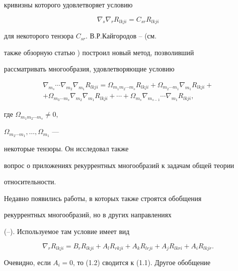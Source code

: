 кривизны которого удовлетворяет условию 


$$ 


\nabla_s\nabla_r R_{lkji}=C_{sr}R_{lkji} 


$$ 


для некоторого тензора $C_{sr}$. В.Р.Кайгородов \cite{4}--\cite{6} (см. 


также обзорную статью \cite{7}) построил новый метод, позволивший 


рассматривать многообразия, удовлетворяющие условию 


\begin{multline*} 


\nabla_{m_s}\dotsb\nabla_{m_2}\nabla_{m_1}R_{lkji}= 


\Omega_{m_1m_2\dotsb m_s}R_{lkji}+\Omega_{m_2\dotsb m_1} 


\nabla_{m_1}R_{lkji}+ \\ 


+\Omega_{m_3\dotsb m_s}\nabla_{m_2}\nabla_{m_1} 


R_{lkji}+\dotsb+\Omega_{m_s}\nabla_{m_{s-1}}\dotsb 


\nabla_{m_1}R_{lkji}, 


\end{multline*} 


где $\Omega_{m_1m_2\dotsb m_s}\ne 0$, 


$\Omega_{m_2\dotsb m_1},\dotsc,\Omega_{m_1}$ --- 


некоторые тензоры. Он исследовал также 


вопрос о приложениях рекуррентных многообразий к задачам общей теории 


относительности. 


 


Недавно появились работы, в которых также строятся обобщения 


рекуррентных многообразий, но в других направлениях 


(\cite{8}--\cite{12}). Используемое там условие имеет вид 


\begin{equation} 


\nabla_r R_{lkji}=B_r R_{lkji}+A_l R_{rkji}+ 


A_k R_{lrji}+A_j R_{lkri}+A_i R_{lkjr}. 


\end{equation} 


Очевидно, если $A_i=0$, то (1.2) сводится к (1.1). Другое обобщение 


